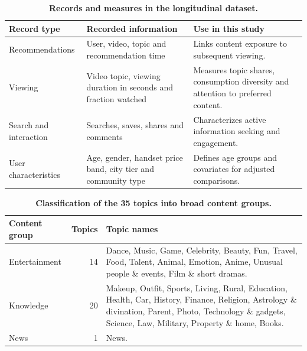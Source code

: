 \begin{table}[H]\centering
\caption{\textbf{Records and measures in the longitudinal dataset.}}\label{tab:data-overview}
\begin{tabularx}{\linewidth}{@{}p{.19\linewidth} >{\raggedright\arraybackslash}X >{\raggedright\arraybackslash}X@{}}\toprule
Record type & Recorded information & Use in this study \\ \midrule
Recommendations & User, video, topic and recommendation time & Links content exposure to subsequent viewing. \\
Viewing & Video topic, viewing duration in seconds and fraction watched & Measures topic shares, consumption diversity and attention to preferred content. \\
Search and interaction & Searches, saves, shares and comments & Characterizes active information seeking and engagement. \\
User characteristics & Age, gender, handset price band, city tier and community type & Defines age groups and covariates for adjusted comparisons. \\
\bottomrule\end{tabularx}
\end{table}

\begin{table}[H]\centering
\caption{\textbf{Classification of the 35 topics into broad content groups.}}\label{tab:topic-composition}
\begin{tabularx}{\linewidth}{@{}lr >{\raggedright\arraybackslash}X@{}}\toprule
Content group & Topics & Topic names \\ \midrule
Entertainment & 14 & Dance, Music, Game, Celebrity, Beauty, Fun, Travel, Food, Talent, Animal, Emotion, Anime, Unusual people \& events, Film \& short dramas. \\
Knowledge & 20 & Makeup, Outfit, Sports, Living, Rural, Education, Health, Car, History, Finance, Religion, Astrology \& divination, Parent, Photo, Technology \& gadgets, Science, Law, Military, Property \& home, Books. \\
News & 1 & News. \\
\bottomrule\end{tabularx}
\end{table}

